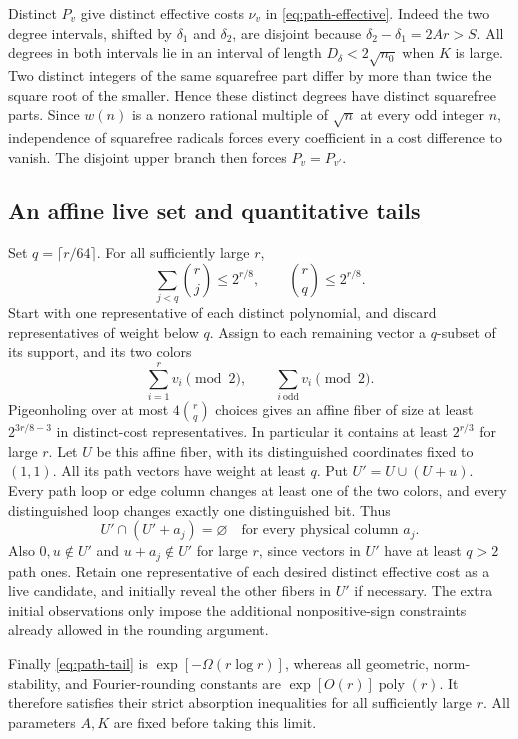 Distinct $P_v$ give distinct effective costs $\nu_v$ in
\eqref{eq:path-effective}. Indeed the two degree intervals, shifted
by $\delta_1$ and $\delta_2$, are disjoint because
$\delta_2-\delta_1=2Ar>S$. All degrees in both intervals lie in an
interval of length $D_\delta<2\sqrt{n_0}$ when $K$ is large.
Two distinct integers of the same squarefree part differ by more than
twice the square root of the smaller. Hence these distinct degrees
have distinct squarefree parts. Since $w(n)$ is a nonzero rational
multiple of $\sqrt n$ at every odd integer $n$, independence of
squarefree radicals forces every coefficient in a cost difference to
vanish. The disjoint upper branch then forces $P_v=P_{v'}$.

\subsection{An affine live set and quantitative tails}

Set $q=\lceil r/64\rceil$. For all sufficiently large $r$,
\[
 \sum_{j<q}\binom rj\le2^{r/8},\qquad \binom rq\le2^{r/8}.
\]
Start with one representative of each distinct polynomial, and discard
representatives of weight below $q$. Assign to each remaining vector
a $q$-subset of its support, and its two colors
\[
 \sum_{i=1}^r v_i\pmod2,\qquad
 \sum_{i\ \mathrm{odd}}v_i\pmod2.
\]
Pigeonholing over at most $4\binom rq$ choices gives an affine fiber
of size at least $2^{3r/8-3}$ in distinct-cost representatives. In
particular it contains at least $2^{r/3}$ for large $r$. Let $U$ be
this affine fiber, with its distinguished coordinates fixed to $(1,1)$.
All its path vectors have weight at least $q$. Put
$U'=U\cup(U+u)$. Every path loop or edge column changes at least
one of the two colors, and every distinguished loop changes exactly
one distinguished bit. Thus
\[
 U'\cap(U'+a_j)=\varnothing\quad\text{for every physical column }a_j.
\]
Also $0,u\notin U'$ and $u+a_j\notin U'$ for large $r$, since
vectors in $U'$ have at least $q>2$ path ones. Retain one representative
of each desired distinct effective cost as a live candidate, and
initially reveal the other fibers in $U'$ if necessary. The extra
initial observations only impose the additional nonpositive-sign
constraints already allowed in the rounding argument.

Finally \eqref{eq:path-tail} is $\exp[-\Omega(r\log r)]$, whereas
all geometric, norm-stability, and Fourier-rounding constants are
$\exp[O(r)]\operatorname{poly}(r)$. It therefore satisfies their
strict absorption inequalities for all sufficiently large $r$.
All parameters $A,K$ are fixed before taking this limit.

